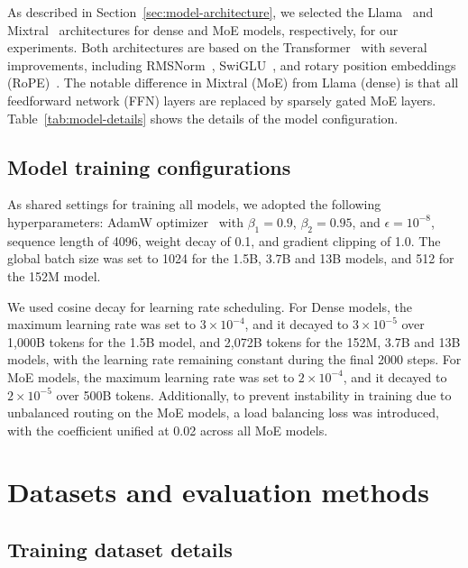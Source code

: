 As described in Section~\ref{sec:model-architecture}, we selected the Llama~\citep{touvron2023llamaopenefficientfoundation} and Mixtral~\citep{jiang2024mixtralexperts} architectures for dense and MoE models, respectively, for our experiments. 
Both architectures are based on the Transformer~\citep{NIPS2017_3f5ee243} with several improvements, including RMSNorm~\citep{zhang-sennrich-neurips19}, SwiGLU~\citep{shazeer2020gluvariantsimprovetransformer}, and rotary position embeddings (RoPE)~\citep{su2024roformer}. 
The notable difference in Mixtral (MoE) from Llama (dense) is that all feedforward network (FFN) layers are replaced by sparsely gated MoE layers. Table~\ref{tab:model-details} shows the details of the model configuration.


\subsection{Model training  configurations}\label{appendix:training_configs_details}

As shared settings for training all models, we adopted the following hyperparameters: AdamW optimizer~\citep{loshchilov2019decoupled} with $\beta_1=0.9$, $\beta_2=0.95$, and $\epsilon=10^{-8}$, sequence length of 4096, weight decay of 0.1, and gradient clipping of 1.0. 
The global batch size was set to 1024 for the 1.5B, 3.7B and 13B models, and 512 for the 152M model.

We used cosine decay for learning rate scheduling. For Dense models, the maximum learning rate was set to $3 \times 10^{-4}$, and it decayed to $3 \times 10^{-5}$ over 1,000B tokens for the 1.5B model, and 2,072B tokens for the 152M, 3.7B and 13B models, with the learning rate remaining constant during the final 2000 steps. 
For MoE models, the maximum learning rate was set to $2 \times 10^{-4}$, and it decayed to $2 \times 10^{-5}$ over 500B tokens.
Additionally, to prevent instability in training due to unbalanced routing on the MoE models, a load balancing loss was introduced, with the coefficient unified at 0.02 across all MoE models.






\section{Datasets and evaluation methods}

\subsection{Training dataset details}\label{appendix:dataset-details}

